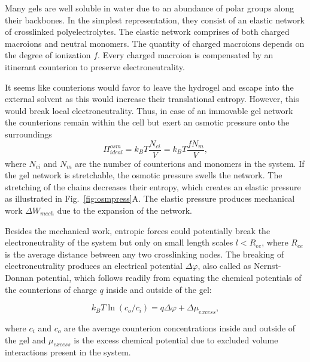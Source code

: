 \documentclass[twoside,twocolumn,9pt]{article}
\begin{document}
Many gels are well soluble in water due to an abundance of polar groups along their backbones. In the simplest representation, they consist of an elastic network of crosslinked polyelectrolytes. The elastic network comprises of both charged macroions and neutral monomers. The quantity of charged macroions depends on the degree of ionization $f$. Every charged macroion is compensated by an itinerant counterion to preserve electroneutrality. 

It seems like counterions would favor to leave the hydrogel and escape into the external solvent as this would increase their translational entropy. However, this would break local electroneutrality. Thus, in case of an immovable gel network the counterions remain within the cell but exert an osmotic pressure onto the surroundings
\begin{equation}\label{eq:osmideal}
    \Pi^{osm}_{ideal} = k_B T \frac{N_{ci}}{V}=k_B T \frac{fN_{m}}{V},
\end{equation}
where $N_{ci}$ and $N_m$ are the number of counterions and monomers in the system. If the gel network is stretchable, the osmotic pressure swells the network. The stretching of the chains decreases their entropy, which creates an elastic pressure as illustrated in Fig.~\ref{fig:osmpress}A. The elastic pressure produces mechanical work $\Delta W_{mech}$ due to the expansion of the network.

Besides the mechanical work, entropic forces could potentially break the electroneutrality of the system but only on small length scales $l < R_{ee}$, where $R
_{ee}$ is the average distance between any two crosslinking nodes. The breaking of electroneutrality produces an electrical potential $\Delta \varphi$, also called as Nernst-Donnan potential, which follows readily from equating the chemical potentials of the counterions of charge $q$ inside and outside of the gel:
%

\begin{equation}\label{eq:donnanpotential}
k_B T \ln (c_o/c_i)= q \Delta \varphi + \Delta \mu_{excess} ,
\end{equation}

where $c_i$ and $c_o$ are the average counterion concentrations inside and outside of the gel and $\mu_{excess}$ is the excess chemical potential due to excluded volume interactions present in the system.
\end{document}
